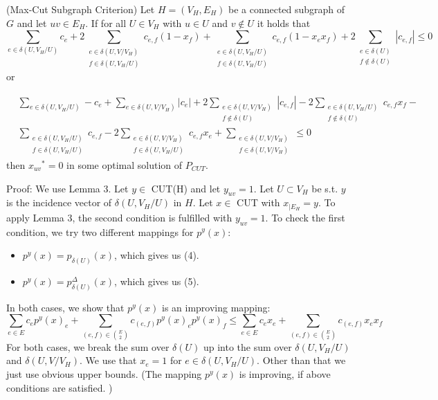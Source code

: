 \begin{theorem}{(Max-Cut Subgraph Criterion)}
Let $H=(V_H,E_H)$ be a connected subgraph of $G$ and let $uv \in E_H$. If for all $U \in V_H$ with $u \in U$ and $v \notin U$ it holds that 
\begin{equation}
    \sum_{e \in \delta(U, V_H / U)} c_e + 2 \sum_{ \substack{e \in \delta(U,V/V_H) \\ f \in \delta(U, V_H / U)}} c_{e,f} (1-x_f) + \sum_{ \substack{e \in \delta(U, V_H / U) \\ f \in \delta(U, V_H / U)}} c_{e,f} (1-x_e x_f) +2 \sum_{ \substack{e \in \delta(U) \\ f \notin \delta(U)}} |c_{e,f}| \leq 0 
\end{equation}
or 

\begin{align}
    & \sum_{e \in \delta(U,V_H/U)} - c_e +\sum_{e \in \delta(U,V/V_H)} |c_e| 
    + 2 \sum_{ \substack{ e \in \delta(U,V/V_H) \\ f \notin \delta(U)}} |c_{e,f}| - 2  \sum_{ \substack{ e \in \delta(U,V_H/U) \\ f \notin \delta(U)}} c_{e,f} x_f - & \\ & \sum_{ \substack{ e \in \delta(U,V_H/U) \\ f \in \delta(U, V_H/U)}} c_{e,f} - 2 \sum_{ \substack{ e \in \delta(U,V/V_H) \\ f \in \delta(U, V_H/U)}} c_{e,f} x_e + \sum_{ \substack{ e \in \delta(U,V/V_H) \\ f \in \delta(U, V/V_H)}} \leq 0 
\end{align}  
then ${x_{uv}}^*=0$ in some optimal solution of $P_{CUT}$.
\end{theorem}
Proof: We use Lemma 3. Let $y \in$ CUT(H) and let $y_{uv}=1$. Let $U \subset V_H$ be s.t. $y$ is the incidence vector of $\delta(U,V_H/U)$ in $H$. Let $x \in$ CUT with $x_{|E_H} =y$.  
To apply Lemma 3, the second condition is fulfilled with $y_{uv}=1$. 
To check the first condition, we try two different mappings for $p^y(x)$: 
\begin{itemize}
    \item $p^y(x) = {p_{\delta(U)}}(x)$, which gives us (4).
    \item $p^y(x)= p^{\Delta}_{\delta(U)}(x)$, which gives us (5).
\end{itemize}

In both cases, we show that $p^y(x)$ is an improving mapping: 
\begin{equation*}
    \sum_{e \in E} c_e {p^y(x)}_e + \sum_{(e,f) \in {E \choose 2}} c_{(e,f)} p^y(x)_e p^y(x)_f \leq \sum_{e \in E} c_e x_e + \sum_{(e,f) \in {E \choose 2}} c_{(e,f)} x_e x_f
\end{equation*}
For both cases, we break the sum over $\delta(U)$ up into the sum over $\delta(U,V_H/U) $ and $\delta(U,V/V_H) $. 
We use that $x_e=1$ for $e \in \delta(U,V_H/U)$. Other than that we just use obvious upper bounds. 
(The mapping $p^y(x)$ is improving, if above conditions are satisfied. )


